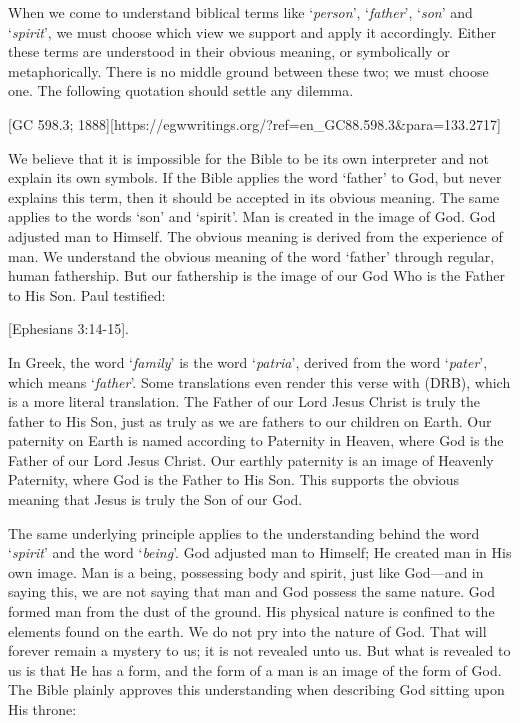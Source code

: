 When we come to understand biblical terms like ‘\textit{person}’, ‘\textit{father}’, ‘\textit{son}’ and ‘\textit{spirit}’, we must choose which view we support and apply it accordingly. Either these terms are understood in their obvious meaning, or symbolically or metaphorically. There is no middle ground between these two; we must choose one. The following quotation should settle any dilemma.

[GC 598.3; 1888][https://egwwritings.org/?ref=en\_GC88.598.3&para=133.2717]

We believe that it is impossible for the Bible to be its own interpreter and not explain its own symbols. If the Bible applies the word ‘father’ to God, but never explains this term, then it should be accepted in its obvious meaning. The same applies to the words ‘son’ and ‘spirit’. Man is created in the image of God. God adjusted man to Himself. The obvious meaning is derived from the experience of man. We understand the obvious meaning of the word ‘father’ through regular, human fathership. But our fathership is the image of our God Who is the Father to His Son. Paul testified:

[Ephesians 3:14-15].

In Greek, the word ‘\textit{family}’ is the word ‘\textit{patria}’, derived from the word ‘\textit{pater}’, which means ‘\textit{father}’. Some translations even render this verse with  (DRB), which is a more literal translation. The Father of our Lord Jesus Christ is truly the father to His Son, just as truly as we are fathers to our children on Earth. Our paternity on Earth is named according to Paternity in Heaven, where God is the Father of our Lord Jesus Christ. Our earthly paternity is an image of Heavenly Paternity, where God is the Father to His Son. This supports the obvious meaning that Jesus is truly the Son of our God.

The same underlying principle applies to the understanding behind the word ‘\textit{spirit}’ and the word ‘\textit{being}’. God adjusted man to Himself; He created man in His own image. Man is a being, possessing body and spirit, just like God—and in saying this, we are not saying that man and God possess the same nature. God formed man from the dust of the ground. His physical nature is confined to the elements found on the earth. We do not pry into the nature of God. That will forever remain a mystery to us; it is not revealed unto us. But what is revealed to us is that He has a form, and the form of a man is an image of the form of God. The Bible plainly approves this understanding when describing God sitting upon His throne:


